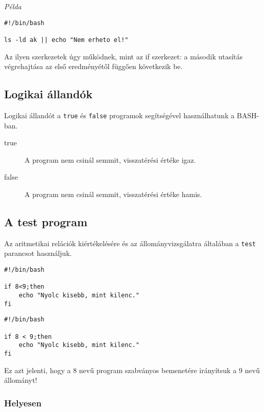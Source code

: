 \emph{Példa}
\begin{lstlisting}
#!/bin/bash

ls -ld ak || echo "Nem erheto el!"
\end{lstlisting}
Az ilyen szerkezetek úgy működnek, mint az if szerkezet: a második utasítás végrehajtása az 
első eredményétől függően következik be.

\subsection{Logikai állandók}
Logikai állandót a \verb.true. és \verb.false. programok segítségével használhatunk a BASH-ban.
\begin{description}
\item[true] A program nem csinál semmit, visszatérési értéke igaz.
\item[false] A program nem csinál semmit, visszatérési értéke hamis.
\end{description}


\subsection{A test program}
Az aritmetikai relációk kiértékelésére és az állományvizsgálatra általában a \texttt{test} parancsot használjuk.

\begin{minipage}{0.42\textwidth}
\lstset{linewidth=\textwidth}
\begin{lstlisting}[rulecolor=\color{red},rulesepcolor=\color{red}]
 #!/bin/bash

if 8<9;then
    echo "Nyolc kisebb, mint kilenc."
fi
\end{lstlisting}
\end{minipage}
\hspace{1em}
\begin{minipage}{0.42\textwidth}
\lstset{linewidth=\textwidth}
\begin{lstlisting}[rulecolor=\color{red},rulesepcolor=\color{red}]
#!/bin/bash

if 8 < 9;then
    echo "Nyolc kisebb, mint kilenc."
fi
\end{lstlisting}
\end{minipage}

 Ez azt jelenti, hogy a 8 nevű program szabványos bemenetére irányítsuk a 9 nevű állományt!
\bigskip

\subsubsection*{Helyesen}

